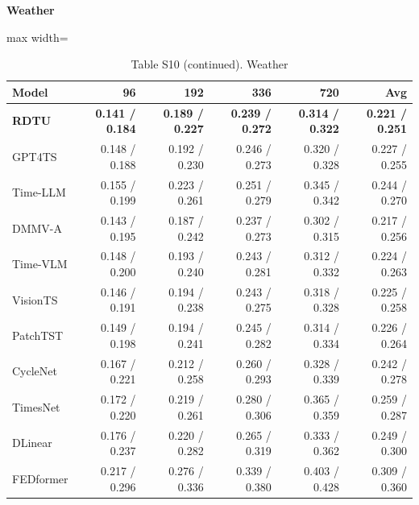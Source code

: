 \begin{table}[H]\centering\small
\caption*{Table S10 (continued). Weather}
\textbf{Weather}\par\smallskip
\begin{adjustbox}{max width=\linewidth}\begin{tabular}{lrrrrr}\toprule
\textbf{Model} & \textbf{96} & \textbf{192} & \textbf{336} & \textbf{720} & \textbf{Avg}\\\midrule
\rowcolor{blue!5}
\textbf{RDTU} & \textbf{0.141 / 0.184} & \textbf{0.189 / 0.227} & \textbf{0.239 / 0.272} & \textbf{0.314 / 0.322} & \textbf{0.221 / 0.251}\\
GPT4TS & 0.148 / 0.188 & 0.192 / 0.230 & 0.246 / 0.273 & 0.320 / 0.328 & 0.227 / 0.255\\
Time-LLM & 0.155 / 0.199 & 0.223 / 0.261 & 0.251 / 0.279 & 0.345 / 0.342 & 0.244 / 0.270\\
DMMV-A & 0.143 / 0.195 & 0.187 / 0.242 & 0.237 / 0.273 & 0.302 / 0.315 & 0.217 / 0.256\\
Time-VLM & 0.148 / 0.200 & 0.193 / 0.240 & 0.243 / 0.281 & 0.312 / 0.332 & 0.224 / 0.263\\
VisionTS & 0.146 / 0.191 & 0.194 / 0.238 & 0.243 / 0.275 & 0.318 / 0.328 & 0.225 / 0.258\\
PatchTST & 0.149 / 0.198 & 0.194 / 0.241 & 0.245 / 0.282 & 0.314 / 0.334 & 0.226 / 0.264\\
CycleNet & 0.167 / 0.221 & 0.212 / 0.258 & 0.260 / 0.293 & 0.328 / 0.339 & 0.242 / 0.278\\
TimesNet & 0.172 / 0.220 & 0.219 / 0.261 & 0.280 / 0.306 & 0.365 / 0.359 & 0.259 / 0.287\\
DLinear & 0.176 / 0.237 & 0.220 / 0.282 & 0.265 / 0.319 & 0.333 / 0.362 & 0.249 / 0.300\\
FEDformer & 0.217 / 0.296 & 0.276 / 0.336 & 0.339 / 0.380 & 0.403 / 0.428 & 0.309 / 0.360\\
\bottomrule\end{tabular}\end{adjustbox}\end{table}
